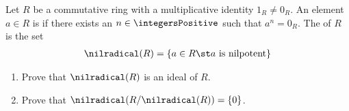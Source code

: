 %
%

\noindent{}Let $R$ be a commutative ring with a multiplicative identity $1_{R} \neq 0_{R}$. An element $a \in R$ is  if there exists an $n \in \integersPositive$ such that $a^{n} = 0_{R}$. The  of $R$ is the set
\begin{align*}
\nilradical(R)
=
\{a \in R \st \text{$a$ is nilpotent}\}
\end{align*}
\begin{enumerate}[label=(\alph*)]
\item\label{itm : LQ01Ca} Prove that $\nilradical(R)$ is an ideal of $R$.
\item\label{itm : LQ01Cb} Prove that $\nilradical(R / \nilradical(R)) = \{0\}$.
\end{enumerate}